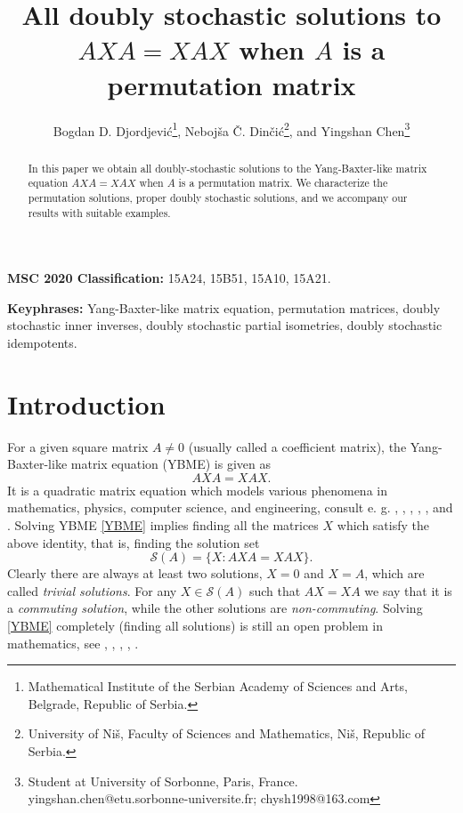 \documentclass{article}
\author{Bogdan D. Djordjevi\'c\footnote{Mathematical Institute of the Serbian Academy of Sciences and Arts, Belgrade, Republic of Serbia.\qquad {\tt bogdan.djordjevic@turing.mi.sanu.ac.rs;\ bogdan.djordjevic93@gmail.com}}, Neboj\v sa \v C. Din\v ci\'c\footnote{University of Ni\v s, Faculty of Sciences and Mathematics, Ni\v s, Republic of Serbia.\qquad {\tt nebojsa.dincic@pmf.edu.rs;\ ndincic@hotmail.com}}, and Yingshan Chen\footnote{Student at University of Sorbonne, Paris, France. yingshan.chen@etu.sorbonne-universite.fr; chysh1998@163.com}}
\date{}
\theoremstyle{definition}\newtheorem{example}{Example}[section]
\def\S{{\mathcal{S}}}
\begin{document}
	
	\title{All doubly stochastic solutions to
		$AXA = XAX$ when $A$ is a permutation matrix}
	
	\maketitle
	
	
	
	
	\begin{abstract}
		In this paper we obtain all doubly-stochastic solutions to the Yang-Baxter-like matrix equation $AXA=XAX$ when $A$ is a permutation matrix. We characterize the permutation solutions, proper doubly stochastic solutions, and we accompany our results with suitable examples. 
	\end{abstract}
	
	
	{\bf MSC 2020 Classification:} {15A24,	15B51, 15A10, 15A21.}
	
	{\bf Keyphrases:} Yang-Baxter-like matrix equation, permutation matrices, doubly stochastic inner inverses, doubly stochastic partial isometries, doubly stochastic idempotents.
	
	
	
	
	\section{Introduction}
	For a given square matrix $A\neq0$ (usually called a coefficient matrix), the Yang-Baxter-like matrix equation (YBME) is given as \begin{equation}
		\label{YBME} AXA=XAX.\end{equation}
	It is a quadratic matrix equation which  models various phenomena in mathematics, physics, computer science, and engineering, consult e. g.  \cite{RJB}, \cite{ABH}, \cite{Fel},  \cite{NVI}, \cite{WSACXX}, and \cite{NCY}. Solving YBME \eqref{YBME} implies finding all the matrices $X$ which satisfy the above identity, that is, finding the solution set
	$$\S(A)=\{X: AXA=XAX\}.$$ 
	Clearly there are always at least two solutions, $X=0$ and $X=A$, which are called \emph{trivial solutions}. For any $X\in \S(A)$ such that $AX=XA$ we say that it is a {\it commuting solution}, while the other solutions are {\it non-commuting}. Solving \eqref{YBME} completely (finding all solutions) is still an open problem in mathematics, see \cite{ChenYong}, \cite{DehShi}, \cite{NCDBDD1}, \cite{NCDBDD2},  \cite{DinRhee2015}.
	
\end{document}
